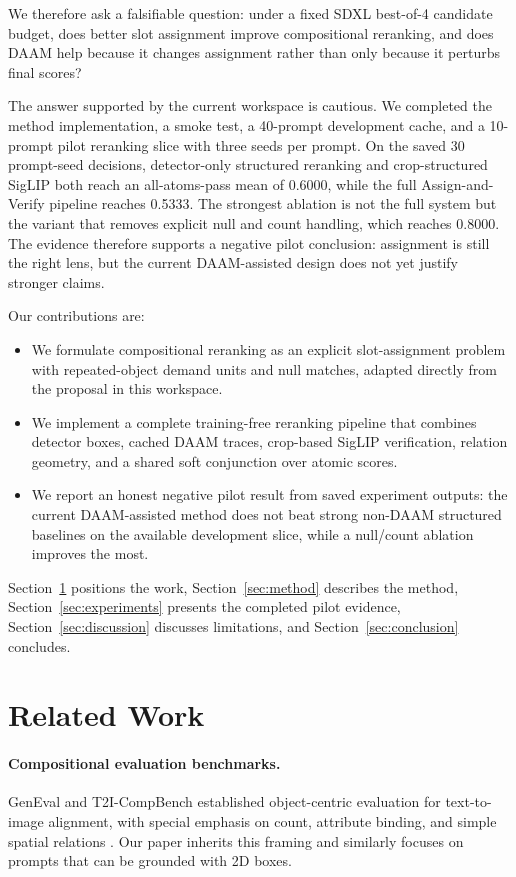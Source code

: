 \documentclass{article}
\newcommand{\method}{Assign-and-Verify\xspace}
\newcommand{\daam}{DAAM\xspace}
\newcommand{\sdxl}{SDXL\xspace}
\begin{document}
We therefore ask a falsifiable question: under a fixed \sdxl best-of-4 candidate budget, does better slot assignment improve compositional reranking, and does \daam help because it changes assignment rather than only because it perturbs final scores?

The answer supported by the current workspace is cautious. We completed the method implementation, a smoke test, a 40-prompt development cache, and a 10-prompt pilot reranking slice with three seeds per prompt. On the saved 30 prompt-seed decisions, detector-only structured reranking and crop-structured SigLIP both reach an all-atoms-pass mean of 0.6000, while the full \method pipeline reaches 0.5333. The strongest ablation is not the full system but the variant that removes explicit null and count handling, which reaches 0.8000. The evidence therefore supports a negative pilot conclusion: assignment is still the right lens, but the current \daam-assisted design does not yet justify stronger claims.

Our contributions are:
\begin{itemize}[leftmargin=*,topsep=2pt,itemsep=2pt]
  \item We formulate compositional reranking as an explicit slot-assignment problem with repeated-object demand units and null matches, adapted directly from the proposal in this workspace.
  \item We implement a complete training-free reranking pipeline that combines detector boxes, cached \daam traces, crop-based SigLIP verification, relation geometry, and a shared soft conjunction over atomic scores.
  \item We report an honest negative pilot result from saved experiment outputs: the current \daam-assisted method does not beat strong non-\daam structured baselines on the available development slice, while a null/count ablation improves the most.
\end{itemize}

Section~\ref{sec:related} positions the work, Section~\ref{sec:method} describes the method, Section~\ref{sec:experiments} presents the completed pilot evidence, Section~\ref{sec:discussion} discusses limitations, and Section~\ref{sec:conclusion} concludes.

\section{Related Work}
\label{sec:related}

\paragraph{Compositional evaluation benchmarks.}
GenEval and T2I-CompBench established object-centric evaluation for text-to-image alignment, with special emphasis on count, attribute binding, and simple spatial relations \citep{ghosh2023geneval,huang2023t2icompbench}. Our paper inherits this framing and similarly focuses on prompts that can be grounded with 2D boxes.
\end{document}
